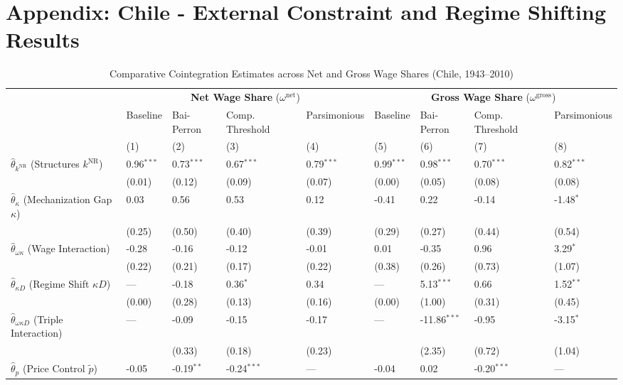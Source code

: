 \section{Appendix: Chile - External Constraint and Regime Shifting Results}
\label{app:chile_full_results}
\begin{table}[h!]
	\centering
	\caption{Comparative Cointegration Estimates across Net and Gross Wage Shares (Chile, 1943--2010)}
	\label{tab:chile_omega_comparison}
	\small
	\begin{tabular}{p{3.5cm}p{1.35cm}p{1.35cm}p{1.35cm}p{1.35cm}p{1.35cm}p{1.35cm}p{1.35cm}p{1.35cm}}
		\toprule
		& \multicolumn{4}{c}{\textbf{Net Wage Share} ($\omega^{\text{net}}$)} & \multicolumn{4}{c}{\textbf{Gross Wage Share} ($\omega^{\text{gross}}$)} \\
		\cmidrule(lr){2-5} \cmidrule(lr){6-9}
		& Baseline & Bai-Perron & Comp. Threshold & Parsimonious & Baseline & Bai-Perron & Comp. Threshold & Parsimonious \\
		& (1) & (2) & (3) & (4) & (5) & (6) & (7) & (8) \\
		\midrule
		$\hat{\theta}_{k^{\text{NR}}}$ (Structures $k^{\text{NR}}$) & 0.96$^{***}$ & 0.73$^{***}$ & 0.67$^{***}$ & 0.79$^{***}$ & 0.99$^{***}$ & 0.98$^{***}$ & 0.70$^{***}$ & 0.82$^{***}$ \\
		& (0.01) & (0.12) & (0.09) & (0.07) & (0.00) & (0.05) & (0.08) & (0.08) \\
		$\hat{\theta}_{\kappa}$ (Mechanization Gap $\kappa$) & 0.03 & 0.56 & 0.53 & 0.12 & -0.41 & 0.22 & -0.14 & -1.48$^{*}$ \\
		& (0.25) & (0.50) & (0.40) & (0.39) & (0.29) & (0.27) & (0.44) & (0.54) \\
		$\hat{\theta}_{\omega\kappa}$ (Wage Interaction) & -0.28 & -0.16 & -0.12 & -0.01 & 0.01 & -0.35 & 0.96 & 3.29$^{*}$ \\
		& (0.22) & (0.21) & (0.17) & (0.22) & (0.38) & (0.26) & (0.73) & (1.07) \\
		$\hat{\theta}_{\kappa D}$ (Regime Shift $\kappa D$) & — & -0.18 & 0.36$^{*}$ & 0.34 & — & 5.13$^{***}$ & 0.66 & 1.52$^{**}$ \\
		& (0.00) & (0.28) & (0.13) & (0.16) & (0.00) & (1.00) & (0.31) & (0.45) \\
		$\hat{\theta}_{\omega\kappa D}$ (Triple Interaction) & — & -0.09 & -0.15 & -0.17 & — & -11.86$^{***}$ & -0.95 & -3.15$^{*}$ \\
		&  & (0.33) & (0.18) & (0.23) &  & (2.35) & (0.72) & (1.04) \\
		$\hat{\theta}_{p}$ (Price Control $\tilde{p}$) & -0.05 & -0.19$^{**}$ & -0.24$^{***}$ & — & -0.04 & 0.02 & -0.20$^{***}$ & — \\

\end{tabular}
\end{table}
